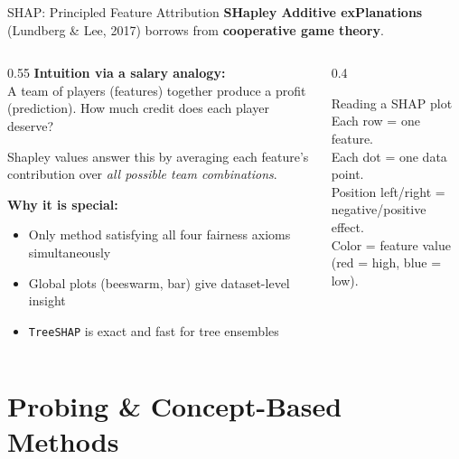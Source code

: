 \documentclass[aspectratio=169]{beamer}
\begin{document}
\begin{frame}{SHAP: Principled Feature Attribution}
  \textbf{SHapley Additive exPlanations} (Lundberg \& Lee, 2017) borrows from
  \textbf{cooperative game theory}.

  \vspace{0.5em}
  \begin{columns}[T]
    \begin{column}{0.55\textwidth}
      \textbf{Intuition via a salary analogy:}\\
      A team of players (features) together produce a profit (prediction).
      How much credit does each player deserve?

      \vspace{0.5em}
      Shapley values answer this by averaging each feature's
      contribution over \emph{all possible team combinations}.

      \vspace{0.6em}
      \textbf{Why it is special:}
      \begin{itemize}
        \item Only method satisfying all four fairness axioms simultaneously
        \item Global plots (beeswarm, bar) give dataset-level insight
        \item \texttt{TreeSHAP} is exact and fast for tree ensembles
      \end{itemize}
    \end{column}
    \begin{column}{0.4\textwidth}
      \begin{exampleblock}{Reading a SHAP plot}
        Each row = one feature.\\
        Each dot = one data point.\\
        Position left/right = negative/positive effect.\\
        Color = feature value (red = high, blue = low).
      \end{exampleblock}
    \end{column}
  \end{columns}
\end{frame}

\section{Probing \& Concept-Based Methods}
\end{document}
